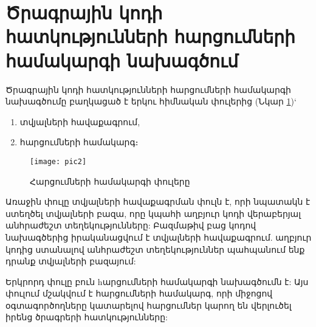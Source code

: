 {
    \clearpage
    \section{Ծրագրային կոդի հատկությունների հարցումների համակարգի նախագծում}\label{sec:queryEngineDesign}
    Ծրագրային կոդի հատկությունների հարցումների համակարգի նախագծումը բաղկացած է երկու հիմնական փուլերից (Նկար \ref{fig:figure2})`
    \begin{enumerate}
        \item տվյալների հավաքագրում,
        \item հարցումների համակարգ։
    \end{enumerate}

    \begin{figure}[h]
        \centering
        \texttt{[image: pic2]}
        \caption{Հարցումների համակարգի փուլերը}
        \label{fig:figure2}
    \end{figure}

    Առաջին փուլը տվյալների հավաքագրման փուլն է, որի նպատակն է ստեղծել տվյալների բազա, որը կպահի աղբյուր կոդի
    վերաբերյալ անհրաժեշտ տեղեկությունները:
    Բազմաթիվ բաց կոդով նախագծերից իրականացվում է տվյալների հավաքագրում.
    աղբյուր կոդից ստանալով անհրաժեշտ տեղեկություններ պահպանում ենք դրանք տվյալների բազայում:

    Երկրորդ փուլը բուն hարցումների համակարգի նախագծումն է: Այս փուլում մշակվում է հարցումների համակարգ, որի միջոցով
    օգտագործողները կատարելով հարցումներ կարող են վերլուծել իրենց ծրագրերի հատկությունները:

    

    
}
